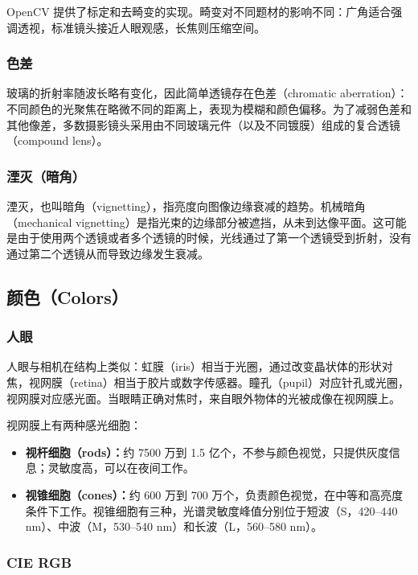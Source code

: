 \documentclass{ctexart}
\begin{document}
OpenCV 提供了标定和去畸变的实现。畸变对不同题材的影响不同：广角适合强调透视，标准镜头接近人眼观感，长焦则压缩空间。

\subsubsection{色差}

玻璃的折射率随波长略有变化，因此简单透镜存在色差（chromatic aberration）：不同颜色的光聚焦在略微不同的距离上，表现为模糊和颜色偏移。为了减弱色差和其他像差，多数摄影镜头采用由不同玻璃元件（以及不同镀膜）组成的复合透镜（compound lens）。

\subsubsection{湮灭（暗角）}

湮灭，也叫暗角（vignetting），指亮度向图像边缘衰减的趋势。机械暗角（mechanical vignetting）是指光束的边缘部分被遮挡，从未到达像平面。这可能是由于使用两个透镜或者多个透镜的时候，光线通过了第一个透镜受到折射，没有通过第二个透镜从而导致边缘发生衰减。

\subsection{颜色（Colors）}

\subsubsection{人眼}

人眼与相机在结构上类似：虹膜（iris）相当于光圈，通过改变晶状体的形状对焦，视网膜（retina）相当于胶片或数字传感器。瞳孔（pupil）对应针孔或光圈，视网膜对应感光面。当眼睛正确对焦时，来自眼外物体的光被成像在视网膜上。

视网膜上有两种感光细胞：

\begin{itemize}
    \item \textbf{视杆细胞（rods）：}约 7500 万到 1.5 亿个，不参与颜色视觉，只提供灰度信息；灵敏度高，可以在夜间工作。
    \item \textbf{视锥细胞（cones）：}约 600 万到 700 万个，负责颜色视觉，在中等和高亮度条件下工作。视锥细胞有三种，光谱灵敏度峰值分别位于短波（S，420--440 nm）、中波（M，530--540 nm）和长波（L，560--580 nm）。
\end{itemize}

\subsubsection{CIE RGB}
\end{document}
